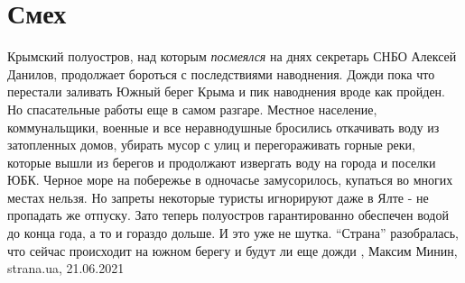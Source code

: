  
 
 
 
 
\chapter{Смех}

Крымский полуостров, над которым \emph{посмеялся} на днях секретарь СНБО
Алексей Данилов, продолжает бороться с последствиями наводнения.  Дожди пока
что перестали заливать Южный берег Крыма и пик наводнения вроде как пройден. Но
спасательные работы еще в самом разгаре.  Местное население, коммунальщики,
военные и все неравнодушные бросились откачивать воду из затопленных домов,
убирать мусор с улиц и перегораживать горные реки, которые вышли из берегов и
продолжают извергать воду на города и поселки ЮБК.  Черное море на побережье в
одночасье замусорилось, купаться во многих местах нельзя. Но запреты некоторые
туристы игнорируют даже в Ялте - не пропадать же отпуску.  Зато теперь
полуостров гарантированно обеспечен водой до конца года, а то и гораздо дольше.
И это уже не шутка.  \enquote{Страна} разобралась, что сейчас происходит на
южном берегу и будут ли еще дожди
, 
Максим Минин, strana.ua, 21.06.2021


